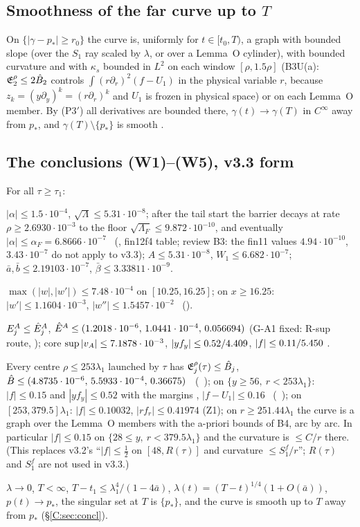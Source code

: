 \documentclass[11pt]{article}
\begin{document}
\subsection{Smoothness of the far curve up to $T$}
On $\{|\gamma-p_*|\ge r_0\}$ the curve is, uniformly for $t\in[t_0,T)$, a graph with bounded slope (over the $S_1$ ray scaled by $\lambda$, or over a Lemma~O cylinder), with bounded curvature and with $\kappa_s$ bounded in $L^2$ on each window $[\rho,1.5\rho]$ (B3U(a): $\mathfrak E^\rho_2\le2\hat B_2$ controls $\int(r\partial_r)^2(f-U_1)$ in the physical variable $r$, because $z_k=(y\partial_y)^k=(r\partial_r)^k$ and $U_1$ is frozen in physical space) or on each Lemma~O member. By (P3$'$) all derivatives are bounded there, $\gamma(t)\to\gamma(T)$ in $C^\infty$ away from $p_*$, and $\gamma(T)\setminus\{p_*\}$ is smooth \tP.

\subsection{The conclusions (W1)--(W5), v3.3 form}\label{C:sec:W}
For all $\tau\ge\tau_1$:
\begin{description}[leftmargin=1.2em]
\item[(W1) trapping] $|\alpha|\le1.5\cdot10^{-4}$, $\sqrt\Lambda\le5.31\cdot10^{-8}$; after the tail start the barrier decays at rate $\rho\ge2.6930\cdot10^{-3}$ to the floor $\sqrt{\Lambda_F}\le9.872\cdot10^{-10}$, and eventually $|\alpha|\le\alpha_F=6.8666\cdot10^{-7}$ \tC\ (\SV, fin12f4 table; review B3: the fin11 values $4.94\cdot10^{-10}$, $3.43\cdot10^{-7}$ do not apply to v3.3); $A\le5.31\cdot10^{-8}$, $W_1\le6.682\cdot10^{-7}$; $\bar a,\bar b\le2.19103\cdot10^{-7}$, $\bar\beta\le3.33811\cdot10^{-9}$.
\item[(W2) tip] $\max(|w|,|w'|)\le7.48\cdot10^{-4}$ on $[10.25,16.25]$; on $x\ge16.25$: $|w'|\le1.1604\cdot10^{-3}$, $|w''|\le1.5457\cdot10^{-2}$ \tC\ (\SV).
\item[(W3) shells] $E^A_j\le\hat E^A_j$, $\hat E^A\le(1.2018\cdot10^{-6},\,1.0441\cdot10^{-4},\,0.056694)$ (G-A1 fixed: R-sup route, ); core $\sup|v_A|\le7.1878\cdot10^{-3}$, $|yf_y|\le0.52/4.409$, $|f|\le0.11/5.450$ \tC\tB.
\item[(W4) far field] Every centre $\rho\le253\lambda_1$ launched by $\tau$ has $\mathfrak E^\rho_j(\tau)\le\hat B_j$, $\hat B\le(4.8735\cdot10^{-6},\,5.5933\cdot10^{-4},\,0.36675)$ \tC\ (\SU\ ); on $\{y\ge56,\ r<253\lambda_1\}$: $|f|\le0.15$ and $|yf_y|\le0.52$ with the margins \UmarV, $|f-U_1|\le0.16$ \tC\ (\SU\ ); on $[253,379.5]\lambda_1$: $|f|\le0.10032$, $|rf_r|\le0.41974$ (Z1); on $r\ge251.44\lambda_1$ the curve is a graph over the Lemma~O members with the a-priori bounds of B4, arc by arc. In particular $|f|\le0.15$ on $\{28\le y,\ r<379.5\lambda_1\}$ and the curvature is $\le C/r$ there. (This replaces v3.2's ``$|f|\le\frac12$ on $[48,R(\tau)]$ and curvature $\le S_1^f/r$''; $R(\tau)$ and $S_1^f$ are not used in v3.3.)
\item[(W5) consequences] $\lambda\to0$, $T<\infty$, $T-t_1\le\lambda_1^4/(1-4\bar a)$, $\lambda(t)=(T-t)^{1/4}(1+O(\bar a))$, $p(t)\to p_*$, the singular set at $T$ is $\{p_*\}$, and the curve is smooth up to $T$ away from $p_*$ (\S\ref{C:sec:concl}).
\end{description}
\end{document}
